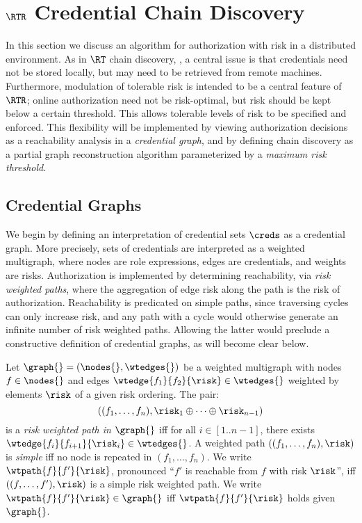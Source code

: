 \section{$\RTR$ Credential Chain Discovery}
\label{section-chain-discovery}

In this section we discuss an algorithm for authorization with risk in a distributed
environment. As in $\RT$ chain discovery, \cite{Li:2003-02}, a central issue is that credentials
need not be stored locally, but may need to be retrieved from remote machines. Furthermore,
modulation of tolerable risk is intended to be a central feature of $\RTR$; online authorization
need not be risk-optimal, but risk should be kept below a certain threshold. This allows
tolerable levels of risk to be specified and enforced. This flexibility will be implemented by
viewing authorization decisions as a reachability analysis in a \emph{credential graph}, and by
defining chain discovery as a partial graph reconstruction algorithm parameterized by a
\emph{maximum risk threshold}.

\subsection{Credential Graphs}

We begin by defining an interpretation of credential sets $\creds$ as a credential graph. More
precisely, sets of credentials are interpreted as a weighted multigraph, where nodes are role
expressions, edges are credentials, and weights are risks. Authorization is implemented by
determining reachability, via \emph{risk weighted paths}, where the aggregation of edge risk
along the path is the risk of authorization. Reachability is predicated on simple paths, since
traversing cycles can only increase risk, and any path with a cycle would otherwise generate an
infinite number of risk weighted paths. Allowing the latter would preclude a constructive
definition of credential graphs, as will become clear below.
\begin{definition}
  Let $\graph{} = (\nodes{}, \wtedges{})$ be a weighted multigraph with nodes $f \in \nodes{}$
  and edges $\wtedge{f_1}{f_2}{\risk} \in \wtedges{}$ weighted by elements $\risk$ of a given
  risk ordering. The pair:
$$((f_1,\ldots,f_n), \risk_1 \oplus \cdots \oplus \risk_{n-1})$$ is a
\emph{risk weighted path in $\graph{}$} iff for all $i \in [1..n-1]$, there exists
$\wtedge{f_i}{f_{i+1}}{\risk_i} \in \wtedges{}$. A weighted path $((f_1,\ldots,f_n), \risk)$ is
\emph{simple} iff no node is repeated in $(f_1,\ldots,f_n)$. We write $\wtpath{f}{f'}{\risk}$,
pronounced ``$f'$ is reachable from $f$ with risk $\risk$'', iff $((f,\ldots,f'), \risk)$ is a
simple risk weighted path. We write $\wtpath{f}{f'}{\risk} \in \graph{}$ iff
$\wtpath{f}{f'}{\risk}$ holds given $\graph{}$.
\end{definition}

